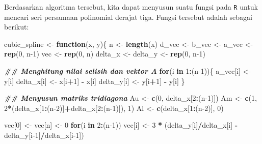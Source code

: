 \documentclass[
]{book}
\newenvironment{Shaded}{\begin{snugshade}}{\end{snugshade}}
\newcommand{\ControlFlowTok}[1]{\textcolor[rgb]{0.13,0.29,0.53}{\textbf{#1}}}
\newcommand{\DecValTok}[1]{\textcolor[rgb]{0.00,0.00,0.81}{#1}}
\newcommand{\DocumentationTok}[1]{\textcolor[rgb]{0.56,0.35,0.01}{\textbf{\textit{#1}}}}
\newcommand{\FunctionTok}[1]{\textcolor[rgb]{0.13,0.29,0.53}{\textbf{#1}}}
\newcommand{\NormalTok}[1]{#1}
\newcommand{\OtherTok}[1]{\textcolor[rgb]{0.56,0.35,0.01}{#1}}
\newcommand{\SpecialCharTok}[1]{\textcolor[rgb]{0.81,0.36,0.00}{\textbf{#1}}}
\theoremstyle{definition}
\theoremstyle{definition}
\theoremstyle{definition}
\theoremstyle{definition}
\theoremstyle{remark}
\begin{document}
Berdasarkan algoritma tersebut, kita dapat menyusun suatu fungsi pada \texttt{R} untuk mencari seri persamaan polinomial derajat tiga. Fungsi tersebut adalah sebagai berikut:

\begin{Shaded}
\begin{Highlighting}[]
\NormalTok{cubic\_spline }\OtherTok{\textless{}{-}} \ControlFlowTok{function}\NormalTok{(x, y)\{}
\NormalTok{  n }\OtherTok{\textless{}{-}} \FunctionTok{length}\NormalTok{(x)}
\NormalTok{  d\_vec }\OtherTok{\textless{}{-}}\NormalTok{ b\_vec }\OtherTok{\textless{}{-}}\NormalTok{ a\_vec }\OtherTok{\textless{}{-}} \FunctionTok{rep}\NormalTok{(}\DecValTok{0}\NormalTok{, n}\DecValTok{{-}1}\NormalTok{)}
\NormalTok{  vec }\OtherTok{\textless{}{-}} \FunctionTok{rep}\NormalTok{(}\DecValTok{0}\NormalTok{, n)}
\NormalTok{  delta\_x }\OtherTok{\textless{}{-}}\NormalTok{ delta\_y }\OtherTok{\textless{}{-}} \FunctionTok{rep}\NormalTok{(}\DecValTok{0}\NormalTok{, n}\DecValTok{{-}1}\NormalTok{)}
  
  \DocumentationTok{\#\# Menghitung nilai selisih dan vektor A}
  \ControlFlowTok{for}\NormalTok{(i }\ControlFlowTok{in} \DecValTok{1}\SpecialCharTok{:}\NormalTok{(n}\DecValTok{{-}1}\NormalTok{))\{}
\NormalTok{    a\_vec[i] }\OtherTok{\textless{}{-}}\NormalTok{ y[i]}
\NormalTok{    delta\_x[i] }\OtherTok{\textless{}{-}}\NormalTok{ x[i}\SpecialCharTok{+}\DecValTok{1}\NormalTok{] }\SpecialCharTok{{-}}\NormalTok{ x[i]}
\NormalTok{    delta\_y[i] }\OtherTok{\textless{}{-}}\NormalTok{ y[i}\SpecialCharTok{+}\DecValTok{1}\NormalTok{] }\SpecialCharTok{{-}}\NormalTok{ y[i]}
\NormalTok{  \}}
  
  \DocumentationTok{\#\# Menyusun matriks tridiagona}
\NormalTok{  Au }\OtherTok{\textless{}{-}} \FunctionTok{c}\NormalTok{(}\DecValTok{0}\NormalTok{, delta\_x[}\DecValTok{2}\SpecialCharTok{:}\NormalTok{(n}\DecValTok{{-}1}\NormalTok{)])}
\NormalTok{  Am }\OtherTok{\textless{}{-}} \FunctionTok{c}\NormalTok{(}\DecValTok{1}\NormalTok{, }\DecValTok{2}\SpecialCharTok{*}\NormalTok{(delta\_x[}\DecValTok{1}\SpecialCharTok{:}\NormalTok{(n}\DecValTok{{-}2}\NormalTok{)]}\SpecialCharTok{+}\NormalTok{delta\_x[}\DecValTok{2}\SpecialCharTok{:}\NormalTok{(n}\DecValTok{{-}1}\NormalTok{)]), }\DecValTok{1}\NormalTok{)}
\NormalTok{  Al }\OtherTok{\textless{}{-}} \FunctionTok{c}\NormalTok{(delta\_x[}\DecValTok{1}\SpecialCharTok{:}\NormalTok{(n}\DecValTok{{-}2}\NormalTok{)], }\DecValTok{0}\NormalTok{)}
  
\NormalTok{  vec[}\DecValTok{0}\NormalTok{] }\OtherTok{\textless{}{-}}\NormalTok{ vec[n] }\OtherTok{\textless{}{-}} \DecValTok{0}
  \ControlFlowTok{for}\NormalTok{(i }\ControlFlowTok{in} \DecValTok{2}\SpecialCharTok{:}\NormalTok{(n}\DecValTok{{-}1}\NormalTok{))}
\NormalTok{    vec[i] }\OtherTok{\textless{}{-}} \DecValTok{3} \SpecialCharTok{*}\NormalTok{ (delta\_y[i]}\SpecialCharTok{/}\NormalTok{delta\_x[i] }\SpecialCharTok{{-}} 
\NormalTok{                   delta\_y[i}\DecValTok{{-}1}\NormalTok{]}\SpecialCharTok{/}\NormalTok{delta\_x[i}\DecValTok{{-}1}\NormalTok{])}
  

\end{Highlighting}
\end{Shaded}
\end{document}
